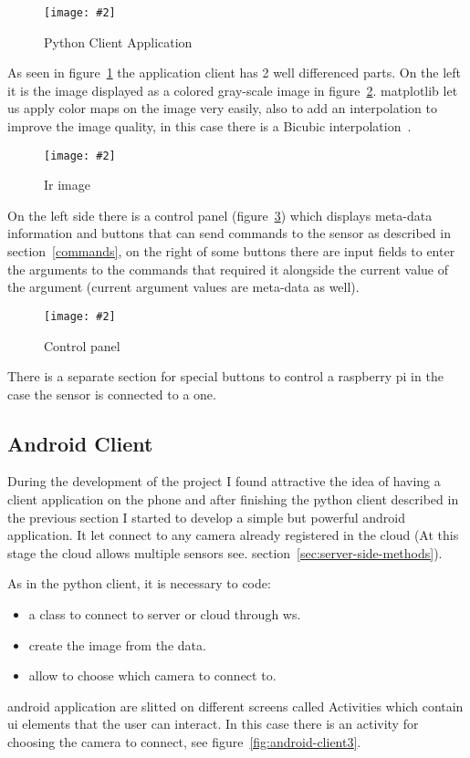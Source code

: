\documentclass[hidelinks,11pt,a4paper,oneside,article]{memoir}
\newcommand{\putimage}[3][10] %
{
\begin{figure}[h]
	\centering
	\captionsetup{justification=centering}
	\texttt{[image: \#2]}
	\caption{#3}
	\label{fig:#2}
\end{figure}
}
\begin{document}
    \putimage{python-client}{Python Client Application}
    
As seen in figure~\ref{fig:python-client} the application client has 2 well differenced parts. On the left it is the image displayed as a colored gray-scale image in figure~\ref{fig:ir-image}. \gls{matplotlib} let us apply color maps on the image very easily, also to add an interpolation to improve the image quality, in this case there is a Bicubic interpolation~\cite{matplotlibinter}.

    \putimage[5]{ir-image}{Ir image}

On the left side there is a control panel (figure~\ref{fig:control-panel}) which displays meta-data information and buttons that can send commands to the sensor as described in section~\ref{commands}, on the right of some buttons there are input fields to enter the arguments to the commands that required it alongside the current value of the argument (current argument values are meta-data as well).

    \putimage{control-panel}{Control panel}
    
There is a separate section for special buttons to control a raspberry pi in the case the sensor is connected to a one.


\subsection{Android Client}
During the development of the project I found attractive the idea of having a client application on the phone and after finishing the python client described in the previous section I started to develop a simple but powerful \gls{android} application. It let connect to any camera already registered in the cloud (At this stage the cloud allows multiple sensors see. section~\ref{sec:server-side-methods}).

As in the python client, it is necessary to code:
\begin{itemize}
    \item a class to connect to server or cloud through \gls{ws}.
    \item create the image from the data.
    \item allow to choose which camera to connect to.
\end{itemize}

\gls{android} application are slitted on different screens called Activities which contain \gls{ui} elements that the user can interact. In this case there is an activity for choosing the camera to connect, see figure~\ref{fig:android-client3}.
\end{document}
